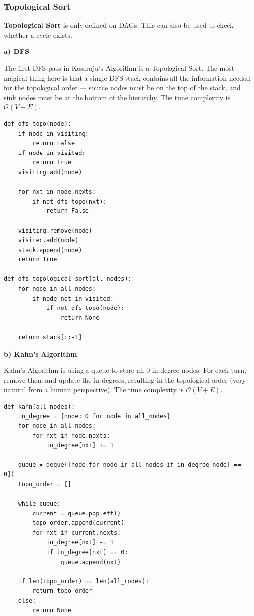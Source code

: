\documentclass{article}
\begin{document}
\subsubsection{Topological Sort}

\textbf{Topological Sort} is only defined on DAGs. This can also be used to check whether a cycle exists.

\textbf{a) DFS}

The first DFS pass in Kosaraju's Algorithm is a Topological Sort. The most magical thing here is that a single DFS stack contains all the information needed for the topological order --- source nodes must be on the top of the stack, and sink nodes must be at the bottom of the hierarchy. The time complexity is $\mathcal O(V+E)$.

\begin{lstlisting}[style=python]
def dfs_topo(node):
    if node in visiting:
        return False
    if node in visited:
        return True
    visiting.add(node)
    
    for nxt in node.nexts:
        if not dfs_topo(nxt):
            return False
            
    visiting.remove(node)
    visited.add(node)
    stack.append(node)
    return True

def dfs_topological_sort(all_nodes):
    for node in all_nodes:
        if node not in visited:
            if not dfs_topo(node):
                return None
                
    return stack[::-1]
\end{lstlisting}


\textbf{b) Kahn's Algorithm}

Kahn's Algorithm is using a queue to store all 0-in-degree nodes. For each turn, remove them and update the in-degrees, resulting in the topological order (very natural from a human perspective). The time complexity is $\mathcal O(V+E)$.

\begin{lstlisting}[style=python]
def kahn(all_nodes):
    in_degree = {node: 0 for node in all_nodes}
    for node in all_nodes:
        for nxt in node.nexts:
            in_degree[nxt] += 1
            
    queue = deque([node for node in all_nodes if in_degree[node] == 0])
    topo_order = []
    
    while queue:
        current = queue.popleft()
        topo_order.append(current)
        for nxt in current.nexts:
            in_degree[nxt] -= 1
            if in_degree[nxt] == 0:
                queue.append(nxt)

    if len(topo_order) == len(all_nodes):
        return topo_order
    else:
        return None
\end{lstlisting}
\end{document}
